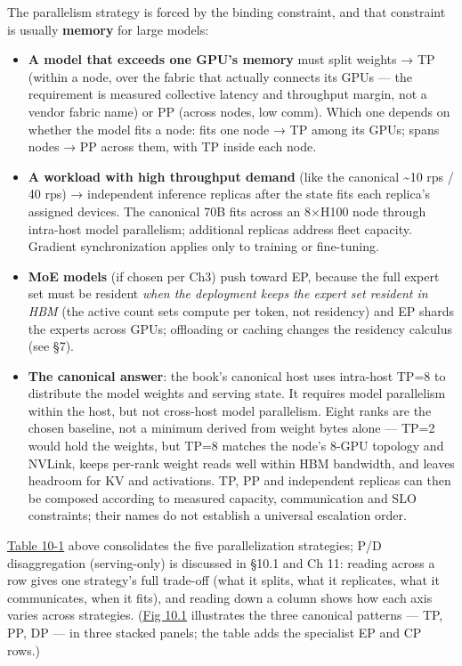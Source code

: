 \label{architecture-consequence}


The parallelism strategy is forced by the binding constraint, and that
constraint is usually \textbf{memory} for large models:

\begin{itemize}
\item
  \textbf{A model that exceeds one GPU's memory} must split weights → TP
  (within a node, over the fabric that actually connects its GPUs ---
  the requirement is measured collective latency and throughput margin,
  not a vendor fabric name) or PP (across nodes, low comm). Which one
  depends on whether the model fits a node: fits one node → TP among its
  GPUs; spans nodes → PP across them, with TP inside each node.
\item
  \textbf{A workload with high throughput demand} (like the canonical
  \textasciitilde10 rps / 40 rps) → independent inference replicas after
  the state fits each replica's assigned devices. The canonical 70B fits
  across an 8×H100 node through intra-host model parallelism; additional
  replicas address fleet capacity. Gradient synchronization applies only
  to training or fine-tuning.
\item
  \textbf{MoE models} (if chosen per Ch3) push toward EP, because the
  full expert set must be resident \emph{when the deployment keeps the
  expert set resident in HBM} (the active count sets compute per token,
  not residency) and EP shards the experts across GPUs; offloading or
  caching changes the residency calculus (see §7).
\item
  \textbf{The canonical answer}: the book's canonical host uses
  intra-host TP=8 to distribute the model weights and serving state. It
  requires model parallelism within the host, but not cross-host model
  parallelism. Eight ranks are the chosen baseline, not a minimum
  derived from weight bytes alone --- TP=2 would hold the weights, but
  TP=8 matches the node's 8-GPU topology and NVLink, keeps per-rank
  weight reads well within HBM bandwidth, and leaves headroom for KV and
  activations. TP, PP and independent replicas can then be composed
  according to measured capacity, communication and SLO constraints;
  their names do not establish a universal escalation order.
\end{itemize}

\hyperref[tab:10.1]{Table 10-1} above consolidates the five parallelization strategies; P/D
disaggregation (serving-only) is discussed in §10.1 and Ch 11: reading
across a row gives one strategy's full trade-off (what it splits, what
it replicates, what it communicates, when it fits), and reading down a
column shows how each axis varies across strategies. (\hyperref[fig:10.1]{Fig 10.1}
illustrates the three canonical patterns --- TP, PP, DP --- in three
stacked panels; the table adds the specialist EP and CP rows.)

